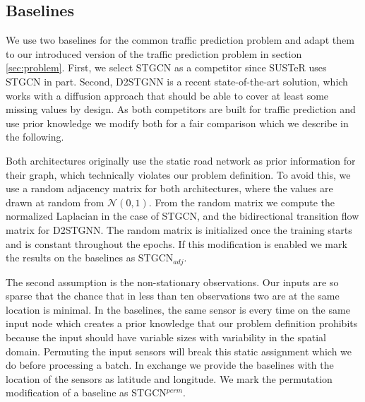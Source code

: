\subsection{Baselines}
\label{subsec:baselines}

We use two baselines for the common traffic prediction problem and adapt them to our introduced version of the traffic prediction problem in section \ref{sec:problem}.
First, we select STGCN \cite{Yu18} as a competitor since SUSTeR uses STGCN in part.
Second, D2STGNN \cite{Shao22} is a recent state-of-the-art solution, which works with a diffusion approach that should be able to cover at least some missing values by design.
As both competitors are built for traffic prediction and use prior knowledge we modify both for a fair comparison which we describe in the following.

Both architectures originally use the static road network as prior information for their graph, which technically violates our problem definition.
To avoid this, we use a random adjacency matrix for both architectures, where the values are drawn at random from $\mathcal{N}(0, 1)$.
From the random matrix we compute the normalized Laplacian in the case of STGCN, and the bidirectional transition flow matrix for D2STGNN.
The random matrix is initialized once the training starts and is constant throughout the epochs.
If this modification is enabled we mark the results on the baselines as STGCN$_{adj}$.

The second assumption is the non-stationary observations. Our inputs are so sparse that the chance that in less than ten observations two are at the same location is minimal.
In the baselines, the same sensor is every time on the same input node which creates a prior knowledge that our problem definition prohibits because the input should have variable sizes with variability in the spatial domain.
Permuting the input sensors will break this static assignment which we do before processing a batch.
In exchange we provide the baselines with the location of the sensors as latitude and longitude.
We mark the permutation modification of a baseline as STGCN$^{perm}$.

